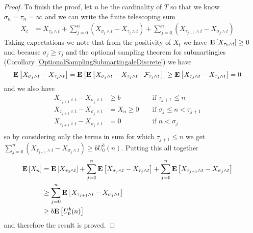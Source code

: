 \begin{proof}
To finish the proof, let $n$ be the cardinality of $T$ so that we know
$\sigma_n = \tau_n = \infty$ and we can write the finite telescoping sum
\begin{align*}
X_t &= X_{\tau_0 \wedge t} + \sum_{j=0}^n \left ( X_{\sigma_j \wedge t} - X_{\tau_j
    \wedge t} \right) + \sum_{j=0}^n \left ( X_{\tau_{j+1} \wedge t} - X_{\sigma_j
    \wedge t} \right)
\end{align*}
Taking expectations we note that from the positivity of $X_t$ we have
$\expectation{X_{\tau_0 \wedge t}}\geq 0$ and because $\sigma_j \geq
\tau_j$ and the optional sampling theorem for submartingles
(Corollary \ref{OptionalSamplingSubmartingaleDiscrete}) we have
\begin{align*}
\expectation{X_{\sigma_j \wedge t} - X_{\tau_j    \wedge t} } &=
\expectation{\cexpectationlong{\mathcal{F}_{\tau_j \wedge t}}{X_{\sigma_j \wedge t}
    - X_{\tau_j    \wedge t}}} 
\geq \expectation{X_{\tau_j \wedge t}
    - X_{\tau_j    \wedge t}} = 0\\
\end{align*}
and we also have
\begin{align*}
X_{\tau_{j+1} \wedge t} - X_{\sigma_j \wedge t} &\geq b && \text{ if  $\tau_{j+1} \leq n$} \\
X_{\tau_{j+1} \wedge t} - X_{\sigma_j \wedge t} &=X_n \geq 0 && \text{ if  $\sigma_j \leq n < \tau_{j+1}$} \\
X_{\tau_{j+1} \wedge t} - X_{\sigma_j \wedge t} &= 0 && \text{ if $n < \sigma_j$} \\
\end{align*}
so by considering only the terms in sum for which $\tau_{j+1} \leq n$
we get $\sum_{j=0}^n \left( X_{\tau_{j+1} \wedge t} - X_{\sigma_j
    \wedge t} \right ) \geq b U_0^b(n)$.   
Putting this all together
\begin{align*}
\expectation{X_n} &= \expectation{X_{\tau_0 \wedge t}} + 
\sum_{j=0}^n \expectation{ X_{\sigma_j \wedge t} - X_{\tau_j \wedge t}} + 
\sum_{j=0}^n \expectation{X_{\tau_{j+1} \wedge t} - X_{\sigma_j \wedge t}} \\
&\geq \sum_{j=0}^n \expectation{X_{\tau_{j+1} \wedge t} - X_{\sigma_j \wedge t}} \\
&\geq b \expectation{U_0^b(n)}
\end{align*}
and therefore the result is proved.
\end{proof}

